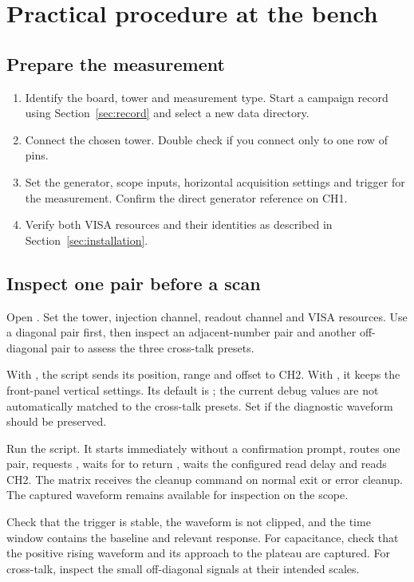 \section{Practical procedure at the bench}
\label{sec:practical}
\subsection{Prepare the measurement}
\begin{enumerate}
\item Identify the board, tower and measurement type. Start a campaign record using Section~\ref{sec:record} and select a new data directory.
\item Connect the chosen tower. Double check if you connect only to one row of pins.
\item Set the generator, scope inputs, horizontal acquisition settings and trigger for the measurement. Confirm the direct generator reference on CH1.
\item Verify both VISA resources and their identities as described in Section~\ref{sec:installation}.
\end{enumerate}

\subsection{Inspect one pair before a scan}
Open . Set the tower, injection channel, readout channel and VISA resources. Use a diagonal pair first, then inspect an adjacent-number pair and another off-diagonal pair to assess the three cross-talk presets.

With , the script sends its position, range and offset to CH2. With , it keeps the front-panel vertical settings. Its default is ; the current debug values are not automatically matched to the cross-talk presets. Set  if the diagnostic waveform should be preserved.

Run the script. It starts immediately without a confirmation prompt, routes one pair, requests , waits for  to return , waits the configured read delay and reads CH2. The matrix receives the cleanup command  on normal exit or error cleanup. The captured waveform remains available for inspection on the scope.

Check that the trigger is stable, the waveform is not clipped, and the time window contains the baseline and relevant response. For capacitance, check that the positive rising waveform and its approach to the plateau are captured. For cross-talk, inspect the small off-diagonal signals at their intended scales.

